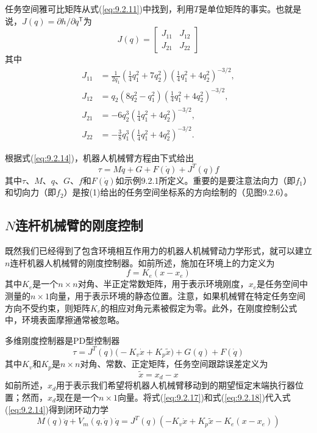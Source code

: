\documentclass[12pt,a4paper]{ctexart}
\begin{document}
任务空间雅可比矩阵从式(\ref{eq:9.2.11})中找到，利用$T$是单位矩阵的事实。也就是说，$J(q)=\partial h/\partial q^{\mathsf T}$为
\begin{equation}\tag{11}
J(q) = \begin{bmatrix} J_{11} & J_{12} \\ J_{21} & J_{22} \end{bmatrix}
\end{equation}
其中
\begin{align*}
J_{11} &= \frac{1}{2q_1}\left(\frac{1}{4}q_1^2 + 7q_2^2\right)\left(\frac{1}{4}q_1^2 + 4q_2^2\right)^{-3/2}, \\
J_{12} &= q_2\left(8q_2^2 - q_1^2\right)\left(\frac{1}{4}q_1^2 + 4q_2^2\right)^{-3/2}, \\
J_{21} &= -6q_2^3\left(\frac{1}{4}q_1^2 + 4q_2^2\right)^{-3/2}, \\
J_{22} &= -\frac{3}{8}q_1^3\left(\frac{1}{4}q_1^2 + 4q_2^2\right)^{-3/2}.
\end{align*}

根据式(\ref{eq:9.2.14})，机器人机械臂方程由下式给出
\begin{equation}\tag{12}
\tau = M\ddot{q} + G + F(\dot{q}) + J^T(q)f
\end{equation}
其中$\tau$、$M$、$q$、$G$、$f$和$F(\dot{q})$如示例9.2.1所定义。重要的是要注意法向力（即$f_1$）和切向力（即$f_2$）是按(1)给出的任务空间坐标系的方向绘制的（见图9.2.6）。

\subsection{$N$连杆机械臂的刚度控制}

既然我们已经得到了包含环境相互作用力的机器人机械臂动力学形式，就可以建立$n$连杆机器人机械臂的刚度控制器。如前所述，施加在环境上的力定义为
\begin{equation}\label{eq:9.2.17}
f = K_e(x - x_e)
\end{equation}
其中$K_e$是一个$n \times n$对角、半正定常数矩阵，用于表示环境刚度，$x_e$是任务空间中测量的$n \times 1$向量，用于表示环境的静态位置。注意，如果机械臂在特定任务空间方向不受约束，则矩阵$K_e$的相应对角元素被假定为零。此外，在刚度控制公式中，环境表面摩擦通常被忽略。

多维刚度控制器是PD型控制器
\begin{equation}\label{eq:9.2.18}
\tau = J^T(q)\bigl(-K_v \dot{x} + K_p \tilde{x}\bigr) + G(q) + F(\dot{q})
\end{equation}
其中$K_v$和$K_p$是$n \times n$对角、常数、正定矩阵，任务空间跟踪误差定义为
\[
\tilde{x} = x_d - x
\]
如前所述，$x_d$用于表示我们希望将机器人机械臂移动到的期望恒定末端执行器位置；然而，$x_d$现在是一个$n \times 1$向量。将式(\ref{eq:9.2.17})和式(\ref{eq:9.2.18})代入式(\ref{eq:9.2.14})得到闭环动力学
\begin{equation}\label{eq:9.2.19}
M(q)\ddot{q} + V_m(q, \dot{q})\dot{q} = J^T(q)(-K_v\dot{x} + K_p\tilde{x} - K_e(x - x_e))
\end{equation}
\end{document}
